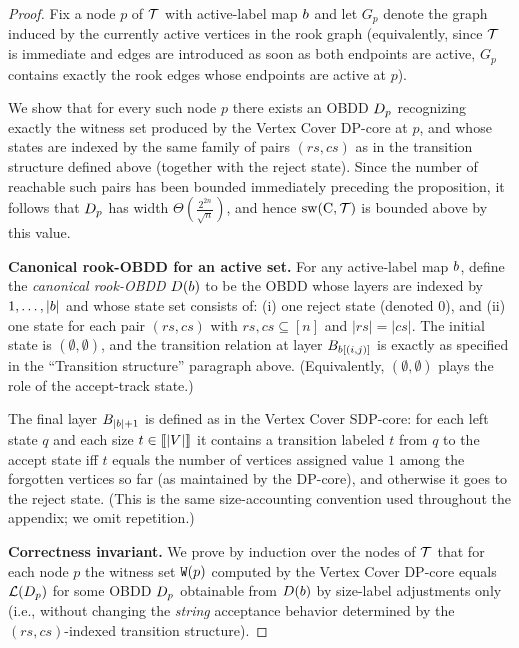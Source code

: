 \begin{proof}
Fix a node $p$ of $\mathcal{T}$ with active-label map $b$ and let
$G_p$ denote the graph induced by the currently active vertices in the rook
graph (equivalently, since $\mathcal{T}$ is immediate and edges are introduced as
soon as both endpoints are active, $G_p$ contains exactly the rook edges whose
endpoints are active at $p$).

We show that for every such node $p$ there exists an OBDD $D_p$ recognizing
exactly the witness set produced by the {\sc Vertex Cover} DP-core at $p$, and
whose states are indexed by the same family of pairs $(rs,cs)$ as in the
transition structure defined above (together with the reject state). Since the
number of reachable such pairs has been bounded immediately preceding the
proposition, it follows that $D_p$ has width
$\Theta\!\left(\frac{2^{2n}}{\sqrt{n}}\right)$, and hence
$\mathrm{sw}(\mathrm{C},\mathcal{T})$ is bounded above by this value.

\smallskip
\noindent\textbf{Canonical rook-OBDD for an active set.}
For any active-label map $b$, define the \emph{canonical rook-OBDD}
$D(b)$ to be the OBDD whose layers are indexed by
$1,\dots,|b|$ and whose state set consists of:
(i) one reject state (denoted $0$), and (ii) one state for each pair
$(rs,cs)$ with $rs,cs \subseteq [n]$ and $|rs|=|cs|$.
The initial state is $(\emptyset,\emptyset)$, and the transition relation at
layer $B_{b[(i,j)]}$ is exactly as specified in the ``Transition
structure'' paragraph above. (Equivalently, $(\emptyset,\emptyset)$ plays the
role of the accept-track state.)

The final layer $B_{|b|+1}$ is defined as in the {\sc Vertex Cover}
SDP-core: for each left state $q$ and each size $t \in \llbracket |V| \rrbracket$ it contains a
transition labeled $t$ from $q$ to the accept state iff $t$ equals the number of
vertices assigned value $1$ among the forgotten vertices so far (as maintained
by the DP-core), and otherwise it goes to the reject state. (This is the same
size-accounting convention used throughout the appendix; we omit repetition.)

\smallskip
\noindent\textbf{Correctness invariant.}
We prove by induction over the nodes of $\mathcal{T}$ that for each node $p$ the
witness set $\texttt{W}(p)$ computed by the {\sc Vertex Cover} DP-core equals
$\mathcal{L}(D_p)$ for some OBDD $D_p$ obtainable from $D(b)$ by
size-label adjustments only (i.e., without changing the \emph{string} acceptance
behavior determined by the $(rs,cs)$-indexed transition structure).


\end{proof}
